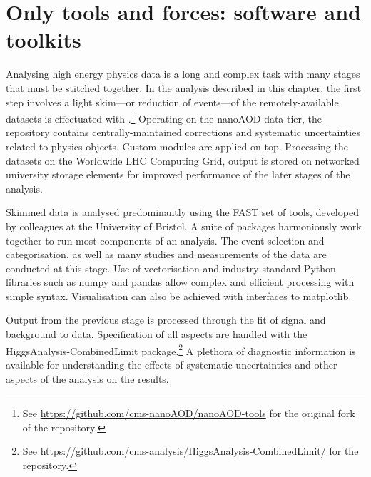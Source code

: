 

\section{Only tools and forces: software and toolkits}
\label{sec:htoinv_software}

Analysing high energy physics data is a long and complex task with many stages that must be stitched together. In the analysis described in this chapter, the first step involves a light skim---or reduction of events---of the remotely-available datasets is effectuated with \nanoAODtools.\footnote{See \url{https://github.com/cms-nanoAOD/nanoAOD-tools} for the original fork of the repository.} Operating on the nanoAOD data tier, the repository contains centrally-maintained corrections and systematic uncertainties related to physics objects. Custom modules are applied on top. Processing the datasets on the Worldwide LHC Computing Grid, output is stored on networked university storage elements for improved performance of the later stages of the analysis.

Skimmed data is analysed predominantly using the FAST set of tools, developed by colleagues at the University of Bristol. A suite of packages harmoniously work together to run most components of an analysis. The event selection and categorisation, as well as many studies and measurements of the data are conducted at this stage. Use of vectorisation and industry-standard Python libraries such as \textsf{numpy} and \textsf{pandas} allow complex and efficient processing with simple syntax. Visualisation can also be achieved with interfaces to \textsf{matplotlib}.

Output from the previous stage is processed through the fit of signal and background to data. Specification of all aspects are handled with the \textsf{HiggsAnalysis-CombinedLimit} package.\footnote{See \url{https://github.com/cms-analysis/HiggsAnalysis-CombinedLimit/} for the repository.} A plethora of diagnostic information is available for understanding the effects of systematic uncertainties and other aspects of the analysis on the results.
